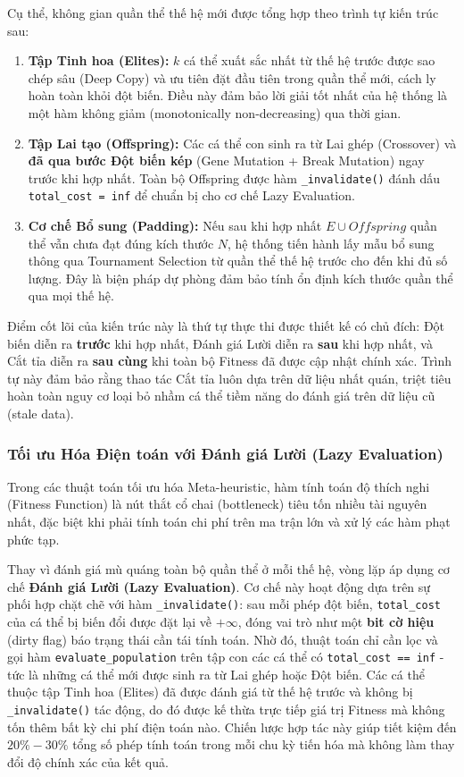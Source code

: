 \documentclass[12pt,a4paper]{article}
\numberwithin{figure}{subsection}
\numberwithin{table}{subsection}
\begin{document}
Cụ thể, không gian quần thể thế hệ mới được tổng hợp theo trình tự kiến trúc sau:
\begin{enumerate}
    \item \textbf{Tập Tinh hoa (Elites):} $k$ cá thể xuất sắc nhất từ thế hệ trước được sao chép sâu (Deep Copy) và ưu tiên đặt đầu tiên trong quần thể mới, cách ly hoàn toàn khỏi đột biến. Điều này đảm bảo lời giải tốt nhất của hệ thống là một hàm không giảm (monotonically non-decreasing) qua thời gian.
    \item \textbf{Tập Lai tạo (Offspring):} Các cá thể con sinh ra từ Lai ghép (Crossover) và \textbf{đã qua bước Đột biến kép} (Gene Mutation + Break Mutation) ngay trước khi hợp nhất. Toàn bộ Offspring được hàm \texttt{\_invalidate()} đánh dấu \texttt{total\_cost = inf} để chuẩn bị cho cơ chế Lazy Evaluation.
    \item \textbf{Cơ chế Bổ sung (Padding):} Nếu sau khi hợp nhất $E \cup Offspring$ quần thể vẫn chưa đạt đúng kích thước $N$, hệ thống tiến hành lấy mẫu bổ sung thông qua Tournament Selection từ quần thể thế hệ trước cho đến khi đủ số lượng. Đây là biện pháp dự phòng đảm bảo tính ổn định kích thước quần thể qua mọi thế hệ.
\end{enumerate}

Điểm cốt lõi của kiến trúc này là thứ tự thực thi được thiết kế có chủ đích: Đột biến diễn ra \textbf{trước} khi hợp nhất, Đánh giá Lười diễn ra \textbf{sau} khi hợp nhất, và Cắt tỉa diễn ra \textbf{sau cùng} khi toàn bộ Fitness đã được cập nhật chính xác. Trình tự này đảm bảo rằng thao tác Cắt tỉa luôn dựa trên dữ liệu nhất quán, triệt tiêu hoàn toàn nguy cơ loại bỏ nhầm cá thể tiềm năng do đánh giá trên dữ liệu cũ (stale data).

\subsubsection{Tối ưu Hóa Điện toán với Đánh giá Lười (Lazy Evaluation)}

Trong các thuật toán tối ưu hóa Meta-heuristic, hàm tính toán độ thích nghi (Fitness Function) là nút thắt cổ chai (bottleneck) tiêu tốn nhiều tài nguyên nhất, đặc biệt khi phải tính toán chi phí trên ma trận lớn và xử lý các hàm phạt phức tạp. 

Thay vì đánh giá mù quáng toàn bộ quần thể ở mỗi thế hệ, vòng lặp áp dụng cơ chế \textbf{Đánh giá Lười (Lazy Evaluation)}. Cơ chế này hoạt động dựa trên sự phối hợp chặt chẽ với hàm \texttt{\_invalidate()}: sau mỗi phép đột biến, \texttt{total\_cost} của cá thể bị biến đổi được đặt lại về $+\infty$, đóng vai trò như một \textbf{bit cờ hiệu} (dirty flag) báo trạng thái cần tái tính toán. Nhờ đó, thuật toán chỉ cần lọc và gọi hàm \texttt{evaluate\_population} trên tập con các cá thể có \texttt{total\_cost == inf} - tức là những cá thể mới được sinh ra từ Lai ghép hoặc Đột biến. Các cá thể thuộc tập Tinh hoa (Elites) đã được đánh giá từ thế hệ trước và không bị \texttt{\_invalidate()} tác động, do đó được kế thừa trực tiếp giá trị Fitness mà không tốn thêm bất kỳ chi phí điện toán nào. Chiến lược hợp tác này giúp tiết kiệm đến $20\%-30\%$ tổng số phép tính toán trong mỗi chu kỳ tiến hóa mà không làm thay đổi độ chính xác của kết quả.
\end{document}
